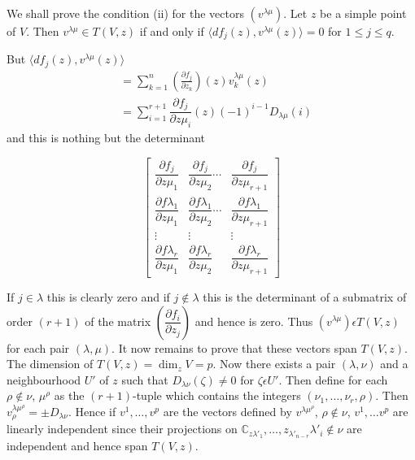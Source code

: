 We shall prove the condition (ii) for the vectors $(v^{\lambda
  \mu})$. Let $z$ be a simple point of $V$. Then $v^{\lambda
  \mu}\in T(V,z)$ if and only if $\langle df_j(z), v^{\lambda
  \mu}(z)\rangle = 0$ for $1 \leq j \leq q$. 

But $\langle df_j(z), v^{\lambda \mu}(z)\rangle$
\begin{align*}
  & = \sum^n_{k=1} \left(\frac{\partial f_j}{\partial z_k}\right) (z)
  v_k^{\lambda \mu}(z)\\ 
  & = \sum^{r+1}_{i=1} \dfrac{\partial f_j}{\partial z \mu_i}
  (z)(-1)^{i-1} D_{\lambda \mu} (i)  
\end{align*}
and this is nothing but the determinant

$$
\begin{bmatrix}
  \dfrac{\partial f_j}{\partial z \mu_1} & \dfrac{\partial f_j}{\partial
    z \mu_2} \cdots & \dfrac{\partial f_j}{\partial z \mu_{r + 1}}\\[10pt] 
  \dfrac{\partial f\lambda_1}{\partial z \mu_1} & \dfrac{\partial
    f\lambda_1}{\partial z \mu_2} \cdots & \dfrac{\partial
    f\lambda_1}{\partial z \mu_{r+1}}\\[5pt] 
  \vdots & \vdots   &  \vdots\\[5pt]
  \dfrac{\partial f\lambda_r}{\partial z \mu_1} & \dfrac{\partial
    f\lambda_r}{\partial z \mu_2} & \dfrac{\partial
    f\lambda_r}{\partial z \mu_{r+1}}
\end{bmatrix}
$$\pageoriginale

If $j \in \lambda$ this is clearly zero and if $j \notin \lambda$ this
is the determinant of a submatrix of order $(r+1)$ of the matrix
$\left(\dfrac{\partial f_i}{\partial z_j}\right)$ and hence is zero. Thus
$(v^{\lambda \mu})\epsilon T(V,z)$ for each pair $(\lambda,\mu)$. It
now remains to prove that these vectors span $T(V,z)$. The dimension
of $T(V,z) = \dim_z V = p$. Now there exists a pair $(\lambda,\nu)$
and a neighbourhood $U'$ of $z$ such that $D_{\lambda \nu}(\zeta)
\neq 0$ for $\zeta \epsilon U'$. Then define for each $\rho \notin
\nu$, $\mu^\rho$ as the $(r+1)$-tuple which contains the integers
$(\nu_1,\ldots,\nu_r,\rho)$. Then $v_\rho^{\lambda \mu^\rho} = \pm D
_{\lambda \nu}$. Hence if $v^1,\ldots,v^p$ are the vectors defined by
$v^{\lambda \mu^\rho}$, $\rho \notin \nu$, $v^1,\ldots v^p$ are linearly
independent since their projections on $\mathbb{C}_{z \lambda'_1},\ldots
, z_{\lambda'_{n-r}}\lambda'_{i}\notin \nu$ are independent and hence span
$T(V,z)$. 

